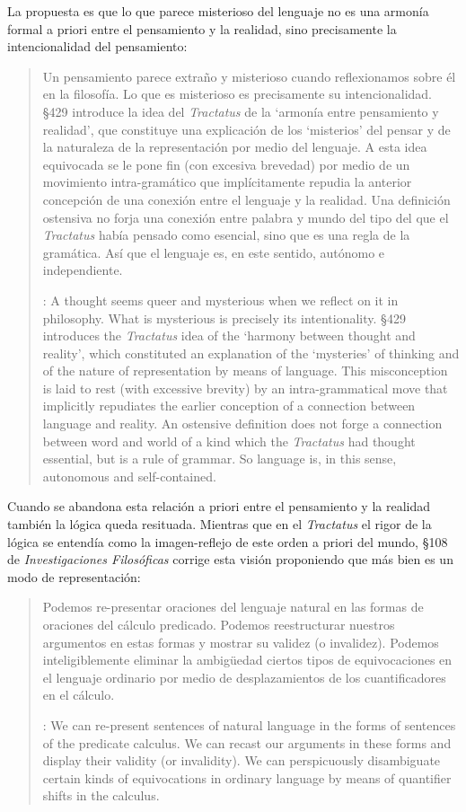 La propuesta es que lo que parece misterioso del lenguaje no es una armonía formal a priori entre el pensamiento y la realidad, sino precisamente la intencionalidad del pensamiento: \blockquote[{\cite[4]{hacker2000mind}}: A thought seems queer and mysterious when we reflect on it in philosophy. What is mysterious is precisely its intentionality. \S429 introduces the \emph{Tractatus} idea of the `harmony between thought and reality', which constituted an explanation of the `mysteries' of thinking and of the nature of representation by means of language. This misconception is laid to rest (with excessive brevity) by an intra-grammatical move that implicitly repudiates the earlier conception of a connection between language and reality. An ostensive definition does not forge a connection between word and world of a kind which the \emph{Tractatus} had thought essential, but is a rule of grammar. So language is, in this sense, autonomous and self-contained.]{Un pensamiento parece extraño y misterioso cuando reflexionamos sobre él en la filosofía. Lo que es misterioso es precisamente su intencionalidad. \S429 introduce la idea del \emph{Tractatus} de la `armonía entre pensamiento y realidad', que constituye una explicación de los `misterios' del pensar y de la naturaleza de la representación por medio del lenguaje. A esta idea equivocada se le pone fin (con excesiva brevedad) por medio de un movimiento intra-gramático que implícitamente repudia la anterior concepción de una conexión entre el lenguaje y la realidad. Una definición ostensiva no forja una conexión entre palabra y mundo del tipo del que el \emph{Tractatus} había pensado como esencial, sino que es una regla de la gramática. Así que el lenguaje es, en este sentido, autónomo e independiente.}

Cuando se abandona esta relación a priori entre el pensamiento y la realidad también la lógica queda resituada. Mientras que en el \emph{Tractatus} el rigor de la lógica se entendía como la imagen-reflejo de este orden a priori del mundo, \S108 de \emph{Investigaciones Filosóficas} corrige esta visión proponiendo que más bien es un modo de representación: \blockquote[{\cite[242]{bakerhacker2009understanding}}: We can re-present sentences of natural language in the forms of sentences of the predicate calculus. We can recast our arguments in these forms and display their validity (or invalidity). We can perspicuously disambiguate certain kinds of equivocations in ordinary language by means of quantifier shifts in the calculus.]{Podemos re-presentar oraciones del lenguaje natural en las formas de oraciones del cálculo predicado. Podemos reestructurar nuestros argumentos en estas formas y mostrar su validez (o invalidez). Podemos inteligiblemente eliminar la ambigüedad ciertos tipos de equivocaciones en el lenguaje ordinario por medio de desplazamientos de los cuantificadores en el cálculo.}

